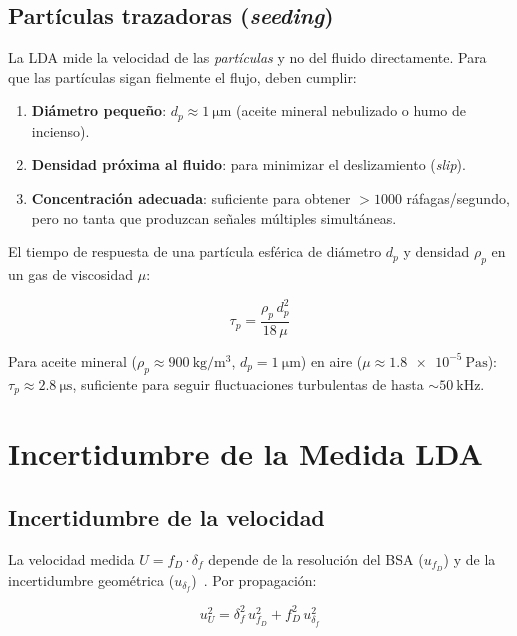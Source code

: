 \documentclass[12pt,a4paper]{article}
\begin{document}
\subsection{Partículas trazadoras (\emph{seeding})}
\label{subsec:seeding}

La LDA mide la velocidad de las \emph{partículas} y no del fluido
directamente.  Para que las partículas sigan fielmente el flujo, deben
cumplir:

\begin{enumerate}
	\item \textbf{Diámetro pequeño}: $d_p \approx \SI{1}{\micro\m}$
	      (aceite mineral nebulizado o humo de incienso).
	\item \textbf{Densidad próxima al fluido}: para minimizar el deslizamiento
	      (\emph{slip}).
	\item \textbf{Concentración adecuada}: suficiente para obtener
	      $>\!1000$ ráfagas/segundo, pero no tanta que produzcan señales
	      múltiples simultáneas.
\end{enumerate}

El tiempo de respuesta de una partícula esférica de diámetro $d_p$ y
densidad $\rho_p$ en un gas de viscosidad $\mu$:

\begin{equation}
	\tau_p = \frac{\rho_p\,d_p^2}{18\,\mu}
	\label{eq:tau_p}
\end{equation}

Para aceite mineral ($\rho_p \approx \SI{900}{\kg\per\m\cubed}$,
$d_p = \SI{1}{\micro\m}$) en aire
($\mu \approx \SI{1,8e-5}{\Pa\s}$):
$\tau_p \approx \SI{2,8}{\micro\s}$, suficiente para seguir fluctuaciones
turbulentas de hasta $\sim\SI{50}{\kHz}$.

\section{Incertidumbre de la Medida LDA}
\label{sec:incertidumbre}

\subsection{Incertidumbre de la velocidad}

La velocidad medida $U = f_D \cdot \delta_f$ depende de la resolución del
BSA ($u_{f_D}$) y de la incertidumbre geométrica
($u_{\delta_f}$)~\cite{gum2008}.  Por propagación:

\begin{equation}
	u_U^2 = \delta_f^2\,u_{f_D}^2 + f_D^2\,u_{\delta_f}^2
	\label{eq:uU_LDA}
\end{equation}
\end{document}

